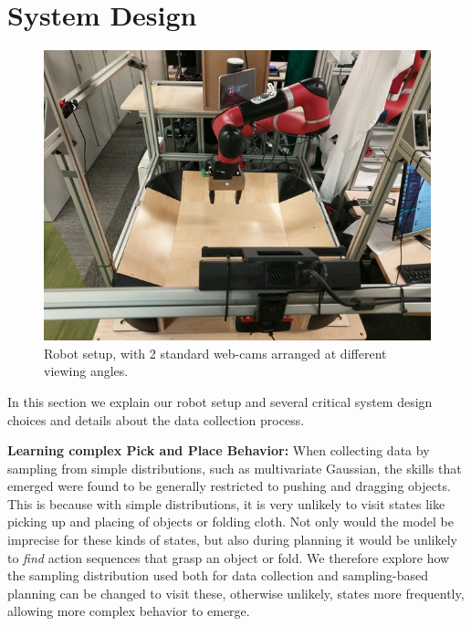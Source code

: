 \section{System Design}
\begin{figure}
	\centering
	\includegraphics[width=1.0\linewidth]{images_general/robot_setup.jpg}
	\caption{\small{Robot setup, with 2 standard web-cams arranged at different viewing angles.}
		\label{fig:robot_setup}
	}
\end{figure}
\label{sec:system}

In this section we explain our robot setup and several critical system design choices and details about the data collection process.

\textbf{Learning complex Pick and Place Behavior:}
When collecting data by sampling from simple distributions, such as multivariate Gaussian, the skills that emerged were found to be generally restricted to pushing and dragging objects. This is because with simple distributions, it is very unlikely to visit states like picking up and placing of objects or folding cloth. Not only would the model be imprecise for these kinds of states, but also during planning it would be unlikely to \emph{find} action sequences that grasp an object or fold. 
We therefore explore how the sampling distribution used both for data collection and sampling-based planning can be changed to visit these, otherwise unlikely, states more frequently, allowing more complex behavior to emerge. 

